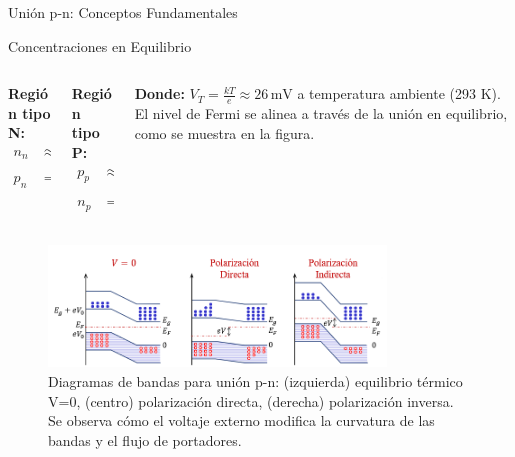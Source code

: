\documentclass[
    10pt,
    aspectratio=169,
    xcolor={dvipsnames},
    spanish,
    ]{beamer}
\begin{document}
\begin{frame}{Unión p-n: Conceptos Fundamentales}
\begin{block}{Concentraciones en Equilibrio}
  \scriptsize
  \begin{columns}
    \begin{column}{0.24\textwidth}
      \textbf{Región tipo N:}
      \begin{align}
        n_n &\approx N_d \\
        p_n &= \frac{n_i^2}{N_d}
      \end{align}
    \end{column}
    
    \begin{column}{0.24\textwidth}
      \textbf{Región tipo P:}
      \begin{align}
        p_p &\approx N_a \\
        n_p &= \frac{n_i^2}{N_a}
      \end{align}
    \end{column}

    \begin{column}{0.48\textwidth}
      \textbf{Donde:} $V_T = \frac{kT}{e} \approx 26\,\text{mV}$ a temperatura ambiente (293 K). El nivel de Fermi se alinea a través de la unión en equilibrio, como se muestra en la figura.
    \end{column}
  \end{columns}
\end{block}
\end{frame}

\begin{frame}
    \begin{figure}[H]
    \centering
    \includegraphics[width=0.8\textwidth]{../figures/Auxiliar_2_14.png}
    \caption{Diagramas de bandas para unión p-n: (izquierda) equilibrio térmico V=0, (centro) polarización directa, (derecha) polarización inversa. Se observa cómo el voltaje externo modifica la curvatura de las bandas y el flujo de portadores.}
  \label{fig:bandas_polarizacion}
\end{figure}
\end{frame}
\end{document}
